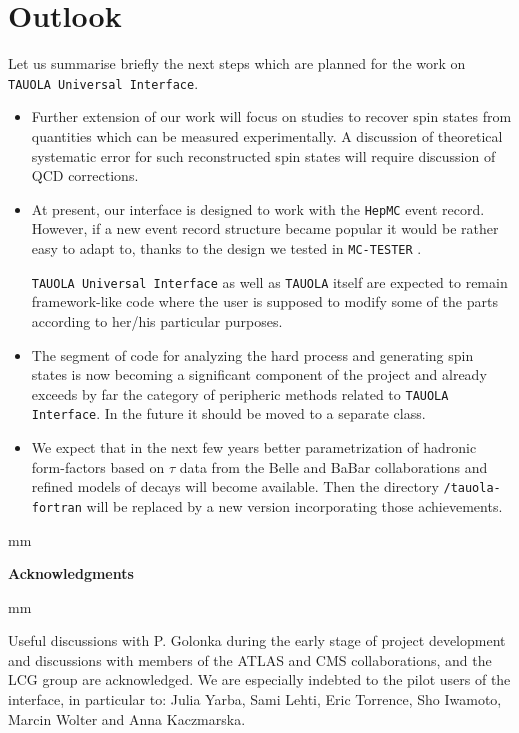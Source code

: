 \documentclass[]{Tauola_interface_design}
\begin{document}
\newpage

\section{Outlook}
Let us summarise briefly the next steps which are planned for the work on {\tt TAUOLA
Universal Interface}.

\begin{itemize}
\item
Further extension of our work will focus 
on studies to recover spin states from quantities which 
can be measured experimentally.
A discussion of theoretical
systematic error for such reconstructed spin states will require discussion of QCD corrections. 

\item
At present, our interface is designed to work with the {\tt HepMC} event record. 
However, if a new event record structure became popular it would be
rather easy to adapt to, thanks to
the design we tested in 
{\tt MC-TESTER} \cite{Golonka:2002rz,Davidson:2008ma}.

{\tt TAUOLA Universal Interface} as well as {\tt TAUOLA} itself are expected to remain 
framework-like code where the user is supposed to modify some of the parts according
to her/his particular purposes. 

\item
The segment of code for analyzing the hard process and generating spin
states is now becoming a significant component of the project and
already exceeds by far the category of peripheric methods related to
{\tt TAUOLA Interface}. In the future it should be moved to a
separate class.
\item
We expect that in the next few years  better parametrization of 
hadronic form-factors based on $\tau$ data from the Belle and BaBar collaborations
and refined models of decays will become available. Then the directory 
{\tt /tauola-fortran} will be 
replaced by a new version incorporating those achievements.
\end{itemize}

 mm
\centerline{\Large\bf Acknowledgments}
 mm

Useful discussions with P. Golonka during the early stage of project development and discussions 
with members of the ATLAS and CMS collaborations, and the LCG group are acknowledged.
We are especially indebted to the pilot users of the interface, in particular to: Julia Yarba, Sami Lehti, Eric Torrence, Sho Iwamoto,
Marcin Wolter
and Anna Kaczmarska.
\end{document}

